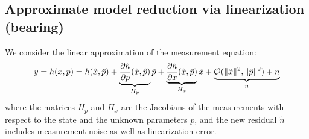 \documentclass[]{article}
\begin{document}
\subsection{Approximate model reduction via linearization (bearing)}

We consider the linear approximation of the measurement equation: 
\begin{equation}
y = h(x,p) = h(\hat x, \hat p) + \underbrace{\frac{\partial h}{\partial p}(\hat x, \hat p)}_{H_p}\tilde p + \underbrace{\frac{\partial h}{\partial x}(\hat x, \hat p)}_{H_x} \tilde x + \underbrace{{\cal O}(\| \tilde x\|^2, \| \tilde p\|^2) + n}_{\tilde n}
\end{equation} 
where the matrices $H_p$ and $H_x$ are the Jacobians of the measurements with respect to the state and the unknown parameters $p$, and the new residual $\tilde n$ includes measurement noise as well as linearization error.
\end{document}
